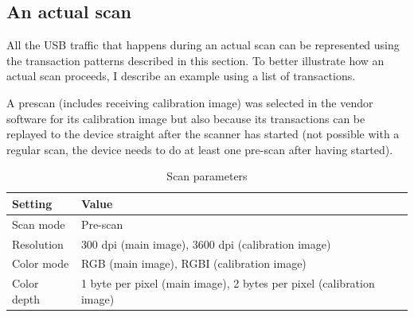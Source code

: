 \documentclass{article}
\begin{document}
\subsection{An actual scan}
\label{ssec:actualscan}

All the USB traffic that happens during an actual scan can be represented
using the transaction patterns described in this section. To better illustrate
how an actual scan proceeds, I describe an example using a list of transactions.

A prescan (includes receiving calibration image) was selected in the vendor software
for its calibration image but also because its transactions can be replayed
to the device straight after the scanner has started
(not possible with a regular scan, the device needs to do at least one pre-scan
after having started).

\begin{table}[H]
  \caption{Scan parameters}
  \centering
  \begin{tabular}{p{4cm} | p{4cm}}
    Setting & Value \\ \hline
    Scan mode & Pre-scan \\
    Resolution & 300 dpi (main image), 3600 dpi (calibration image) \\
    Color mode & RGB (main image), RGBI (calibration image) \\
    Color depth & 1 byte per pixel (main image), 2 bytes per pixel (calibration image) \\
    \end{tabular}
\end{table}
\end{document}
